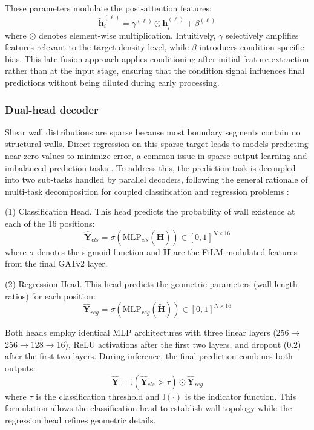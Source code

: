 These parameters modulate the post-attention features:
\begin{equation}
\tilde{\mathbf{h}}_i^{(\ell)} = \gamma^{(\ell)} \odot \mathbf{h}_i^{(\ell)} + \beta^{(\ell)}
\label{eq:method_film}
\end{equation}
where $\odot$ denotes element-wise multiplication.
Intuitively, $\gamma$ selectively amplifies features relevant to the target density level, while $\beta$ introduces condition-specific bias.
This late-fusion approach applies conditioning after initial feature extraction rather than at the input stage, ensuring that the condition signal influences final predictions without being diluted during early processing.

\subsubsection{Dual-head decoder}

Shear wall distributions are sparse because most boundary segments contain no structural walls.
Direct regression on this sparse target leads to models predicting near-zero values to minimize error, a common issue in sparse-output learning and imbalanced prediction tasks \cite{johnsonSurveyDeepLearning2019}. To address this, the prediction task is decoupled into two sub-tasks handled by parallel decoders, following the general rationale of multi-task decomposition for coupled classification and regression problems \cite{ottJointClassificationTrajectory2022}:

(1) Classification Head. This head predicts the probability of wall existence at each of the 16 positions:
\begin{equation}
\hat{\mathbf{Y}}_{cls} = \sigma(\text{MLP}_{cls}(\tilde{\mathbf{H}})) \in [0,1]^{N \times 16}
\label{eq:method_cls_head}
\end{equation}
where $\sigma$ denotes the sigmoid function and $\tilde{\mathbf{H}}$ are the FiLM-modulated features from the final GATv2 layer.

(2) Regression Head. This head predicts the geometric parameters (wall length ratios) for each position:
\begin{equation}
\hat{\mathbf{Y}}_{reg} = \sigma(\text{MLP}_{reg}(\tilde{\mathbf{H}})) \in [0,1]^{N \times 16}
\label{eq:method_reg_head}
\end{equation}

Both heads employ identical MLP architectures with three linear layers (256$\to$256$\to$128$\to$16), ReLU activations after the first two layers, and dropout (0.2) after the first two layers. During inference, the final prediction combines both outputs:
\begin{equation}
\hat{\mathbf{Y}} = \mathbb{I}(\hat{\mathbf{Y}}_{cls} > \tau) \odot \hat{\mathbf{Y}}_{reg}
\label{eq:method_infer_comb}
\end{equation}
where $\tau$ is the classification threshold and $\mathbb{I}(\cdot)$ is the indicator function.
This formulation allows the classification head to establish wall topology while the regression head refines geometric details.

